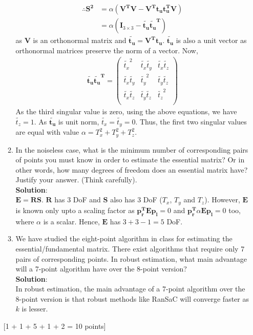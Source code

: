 \documentclass[11pt]{article}
\begin{document}
\begin{enumerate}
\begin{enumerate}
\begin{align*}
\therefore \mathbf{S^2} &= \alpha(\mathbf{V^T}\mathbf{V} - \mathbf{V^T}\mathbf{t_u}\mathbf{t_u^T}\mathbf{V})\\
&= \alpha(\textbf{I}_{3 \times 3} - \mathbf{\tilde{t_u}}\mathbf{\tilde{t_u}^T})
\end{align*}
as $\mathbf{V}$ is an orthonormal matrix and $\mathbf{\tilde{t_u}} = \mathbf{V^T}\mathbf{t_u}$. $\mathbf{\tilde{t_u}}$ is also a unit vector as orthonormal matrices preserve the norm of a vector. Now,
\begin{align*}
\mathbf{\tilde{t_u}}\mathbf{\tilde{t_u}^T} = 
\begin{pmatrix}
\tilde{t_x}^2 & \tilde{t_x}\tilde{t_y} & \tilde{t_x}\tilde{t_z} \\
\tilde{t_x}\tilde{t_y} & \tilde{t_y}^2 & \tilde{t_y}\tilde{t_z} \\
\tilde{t_x}\tilde{t_z} & \tilde{t_y}\tilde{t_z} & \tilde{t_z}^2 \\
\end{pmatrix}
\end{align*}
As the third singular value is zero, using the above equations, we have $\tilde{t_z} = 1$. As $\mathbf{\tilde{t_u}}$ is unit norm, $\tilde{t_x} = \tilde{t_y} = 0$. Thus, the first two singular values are equal with value $\alpha = T_x^2+T_y^2+T_z^2$.

\item In the noiseless case, what is the minimum number of corresponding pairs of points you must know in order to estimate the essential matrix? Or in other words, how many degrees of freedom does an essential matrix have? Justify your answer. (Think carefully). \\

\textbf{Solution}:\\
$\mathbf{E} = \mathbf{R}\mathbf{S}$. $\mathbf{R}$ has 3 DoF and $\mathbf{S}$ also has 3 DoF ($T_x$, $T_y$ and $T_z$). However, $\mathbf{E}$ is known only upto a scaling factor as $\mathbf{p_r^T}\mathbf{E}\mathbf{p_l} = 0$ and $\mathbf{p_r^T}\alpha\mathbf{E}\mathbf{p_l} = 0$ too, where $\alpha$ is a scalar. Hence, $\mathbf{E}$ has $3+3-1=5$ DoF.
\item We have studied the eight-point algorithm in class for estimating the essential/fundamental matrix. There exist algorithms that require only 7 pairs of corresponding points. In robust estimation, what main advantage will a 7-point algorithm have over the 8-point version? \\

\textbf{Solution}:\\
In robust estimation, the main advantage of a 7-point algorithm over the 8-point version is that robust methods like RanSaC will converge faster as $k$ is lesser.
\end{enumerate}
\textsf{[1 + 1 + 5 + 1 + 2 = 10 points]}


\end{enumerate}
\end{document}
